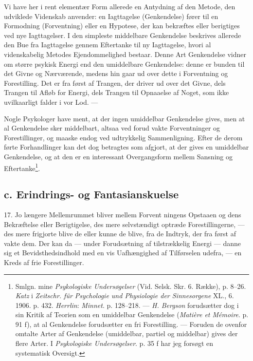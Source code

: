 \documentclass[12pt,a4paper]{book}
\newcommand{\opage}[1]{\marginnote{\footnotesize\textit{[#1]}}}
\begin{document}
Vi have her i rent elementær Form allerede en Antydning af den Metode, den udviklede
Videnskab anvender: en Iagttagelse (Genkendelse) fører til en Formodning
(Forventning) eller en Hypotese, der kan bekræftes eller berigtiges ved
nye Iagttagelser. I den simpleste middelbare Genkendelse beskrives
allerede den Bue fra Iagttagelse gennem Eftertanke til ny Iagttagelse,
hvori al videnskabelig Metodes Ejendommelighed bestaar. Denne Art
Genkendelse vidner om større psykisk Energi end den umiddelbare
Genkendelse: denne er bunden til det Givne og Nærværende, medens hin
gaar ud over dette i Forventning og Forestilling. Det er fra først af
Trangen, der driver ud over det Givne, dels Trangen til Afløb for Energi,
dels Trangen til Opnaaelse af Noget, som ikke uvilkaarligt falder i vor
Lod. ---

Nogle Psykologer have ment, at der ingen umiddelbar Genkendelse gives,
men at al Genkendelse sker middelbart, altsaa ved forud vakte
Forventninger og Forestillinger, og maaske endog ved udtrykkelig
Sammenligning. Efter de derom førte Forhandlinger kan det dog betragtes
som afgjort, at der gives en umiddelbar Genkendelse, og at den er en
interessant Overgangsform mellem Sansning og Eftertanke\footnote{Smlgn.
mine \emph{Psykologiske Undersøgelser} (Vid. Selsk. Skr. 6. Række),
p. 8--26. \emph{Katz} i \emph{Zeitschr. für Psychologie und Physiologie
der Sinnesorgene} XL., 6. 1906. p. 432. \emph{Herrlin}: \emph{Minnet}.
p. 128--218. --- \emph{H. Bergson} forudsætter dog i sin Kritik af
Teorien som en umiddelbar Genkendelse (\emph{Matière et Mémoire}. p. 91
f), at al Genkendelse forudsætter en fri Forestilling. --- Foruden de
ovenfor omtalte Arter af Genkendelse (umiddelbar, partiel og middelbar)
gives der flere Arter. I \emph{Psykologiske Undersøgelser}. p. 35 f har
jeg forsøgt en systematisk Oversigt.}.

\subsection*{c. Erindrings- og Fantasianskuelse}
\label{ssec:erindring}

17. Jo længere Mellemrummet bliver mellem Forvent%
\opage{52}ningens Opstaaen og
dens Bekræftelse eller Berigtigelse, des mere selvstændigt optræde
Forestillingerne, --- des mere frigjorte blive de eller kunne de blive,
fra de Indtryk, der fra først af vakte dem. Der kan da --- under
Forudsætning af tilstrækkelig Energi --- danne sig et Bevidsthedsindhold
med en vis Uafhængighed af Tilførselen udefra, --- en Kreds af frie
Forestillinger.
\end{document}
